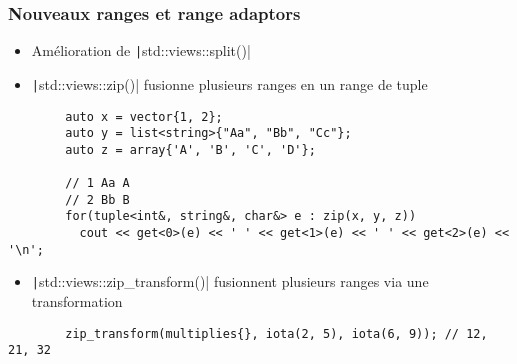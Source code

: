 \documentclass[C++.tex]{subfiles}
\begin{document}
\begin{frame}[fragile]
	\frametitle{Nouveaux ranges et range adaptors}
	\begin{itemize}
		\item Amélioration de \texttt|std::views::split()|
		\item \texttt|std::views::zip()| fusionne plusieurs ranges en un range de tuple
	\end{itemize}

	\begin{verbatim}
		auto x = vector{1, 2};
		auto y = list<string>{"Aa", "Bb", "Cc"};
		auto z = array{'A', 'B', 'C', 'D'};

		// 1 Aa A
		// 2 Bb B
		for(tuple<int&, string&, char&> e : zip(x, y, z))
		  cout << get<0>(e) << ' ' << get<1>(e) << ' ' << get<2>(e) << '\n';
   	\end{verbatim}

	\begin{itemize}
		\item \texttt|std::views::zip_transform()| fusionnent plusieurs ranges via une transformation
	\end{itemize}

	\begin{verbatim}
		zip_transform(multiplies{}, iota(2, 5), iota(6, 9)); // 12, 21, 32
   	\end{verbatim}



\end{frame}
\end{document}
